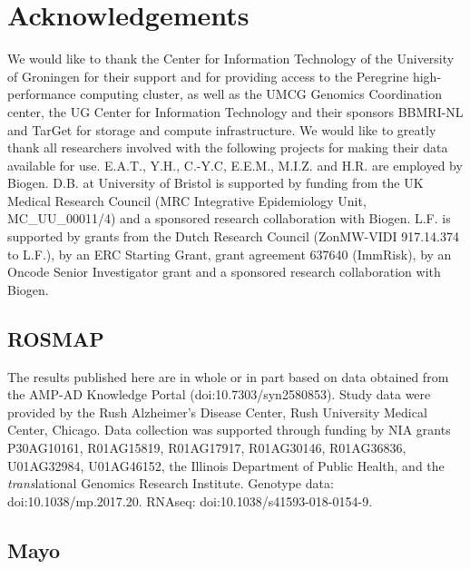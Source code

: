 \section*{Acknowledgements}
We would like to thank the Center for Information Technology of the University of Groningen for their support and for providing access to the Peregrine high-performance computing cluster, as well as the UMCG Genomics Coordination center, the UG Center for Information Technology and their sponsors BBMRI-NL and TarGet for storage and compute infrastructure. We would like to greatly thank all researchers involved with the following projects for making their data available for use. E.A.T., Y.H., C.-Y.C, E.E.M., M.I.Z. and H.R. are employed by Biogen. D.B. at University of Bristol is supported by funding from the UK Medical Research Council (MRC Integrative Epidemiology Unit, MC\_UU\_00011/4) and a sponsored research collaboration with Biogen. L.F. is supported by grants from the Dutch Research Council (ZonMW-VIDI 917.14.374 to L.F.), by an ERC Starting Grant, grant agreement 637640 (ImmRisk), by an Oncode Senior Investigator grant and a sponsored research collaboration with Biogen.  

\subsection*{ROSMAP}

The results published here are in whole or in part based on data obtained from the AMP-AD Knowledge Portal (doi:10.7303/syn2580853). Study data were provided by the Rush Alzheimer’s Disease Center, Rush University Medical Center, Chicago. Data collection was supported through funding by NIA grants P30AG10161, R01AG15819, R01AG17917, R01AG30146, R01AG36836, U01AG32984, U01AG46152, the Illinois Department of Public Health, and the \emph{trans}lational Genomics Research Institute. 
Genotype data: doi:10.1038/mp.2017.20. RNAseq: doi:10.1038/s41593-018-0154-9.  

\subsection*{Mayo}

